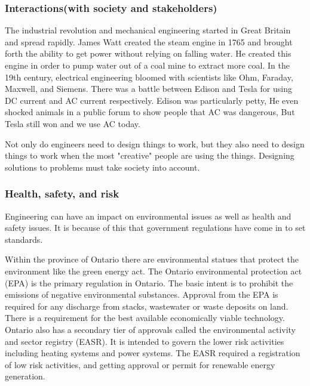 \documentclass[12pt,a4paper]{report}
\begin{document}
    \subsubsection{Interactions(with society and stakeholders)}
    
    The industrial revolution and mechanical engineering started in Great Britain and spread rapidly. James Watt created the steam engine in 1765 and brought forth the ability to get power without relying on falling water. He created this engine in order to pump water out of a coal mine to extract more coal. In the 19th century, electrical engineering bloomed with scientists like Ohm, Faraday, Maxwell, and Siemens. There was a battle between Edison and Tesla for using DC current and AC current respectively. Edison was particularly petty, He even shocked animals in a public forum to show people that AC was dangerous, But Tesla still won and we use AC today. 
    \par
    Not only do engineers need to design things to work, but they also need to design things to work when the most "creative" people are using the things. Designing solutions to problems must take society into account.
    
    \subsubsection{Health, safety, and risk}
    
    Engineering can have an impact on environmental issues as well as health and safety issues. It is because of this that government regulations have come in to set standards.\par
    
    Within the province of Ontario there are environmental statues that protect the environment like the green energy act. The Ontario environmental protection act (EPA) is the primary regulation in Ontario. The basic intent is to prohibit the emissions of negative environmental substances.  Approval from the EPA is required for any discharge from stacks, wastewater or waste deposits on land. There is a requirement for the best available economically viable technology. Ontario also has a secondary tier of approvals called the environmental activity and sector registry (EASR). It is intended to govern the lower risk activities including heating systems and power systems. The EASR required a registration of low risk activities, and getting approval or permit for renewable energy generation. \par
    
\end{document}
